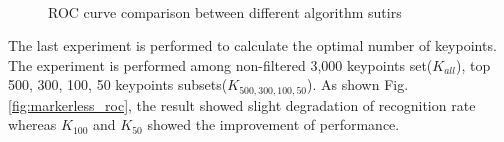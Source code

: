 \begin{figure}[hb!]
  \centering     %
    \\
  \caption{ROC curve comparison between different algorithm sutirs}
    \label{fig:algorithm_comparison}
\end{figure}


The last experiment is performed to calculate the optimal number of keypoints. The experiment is performed among non-filtered 3,000 keypoints set($K_{all}$), top 500, 300, 100, 50 keypoints subsets($K_{500, 300, 100, 50}$). As shown Fig. \ref{fig:markerless_roc}, the result showed slight degradation of recognition rate whereas $K_{100}$ and $K_{50}$ showed the improvement of performance.  

